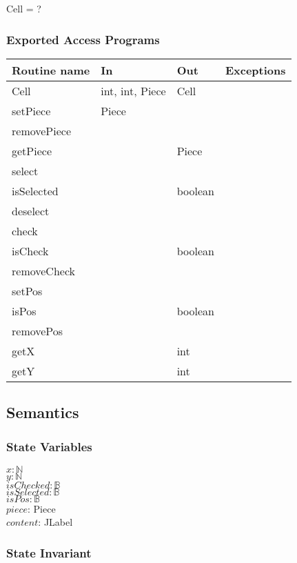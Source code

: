 \documentclass[12pt]{article}
\begin{document}
Cell = ?

\subsubsection* {Exported Access Programs}

\begin{tabular}{| l | l | l | l |}
\hline
\textbf{Routine name} & \textbf{In} & \textbf{Out} & \textbf{Exceptions}\\
\hline
Cell & int, int, Piece & Cell & ~\\
\hline
setPiece & Piece & ~ & ~\\
\hline
removePiece & ~ & ~ & ~\\
\hline
getPiece & ~ & Piece & ~\\
\hline 
select & ~ & ~ & ~\\
\hline 
isSelected & ~ & boolean & ~\\
\hline 
deselect & ~ & ~ & ~\\
\hline 
check & ~ & ~ & ~\\
\hline 
isCheck & ~ & boolean & ~\\
\hline 
removeCheck & ~ & ~ & ~\\
\hline
setPos & ~ & ~ & ~\\
\hline
isPos & ~ & boolean & ~\\
\hline
removePos & ~ & ~ & ~ \\
\hline
getX & ~ & int & ~\\
\hline
getY & ~ & int & ~\\
\hline
\end{tabular}
\newpage 
\subsection* {Semantics}

\subsubsection* {State Variables}

$x: \mathbb{N}$\\
$y: \mathbb{N}$\\
$isChecked: \mathbb{B}$\\
$isSelected: \mathbb{B}$\\
$isPos: \mathbb{B}$\\
$piece$: Piece\\
$content$: JLabel\\

\subsubsection* {State Invariant}
\end{document}
